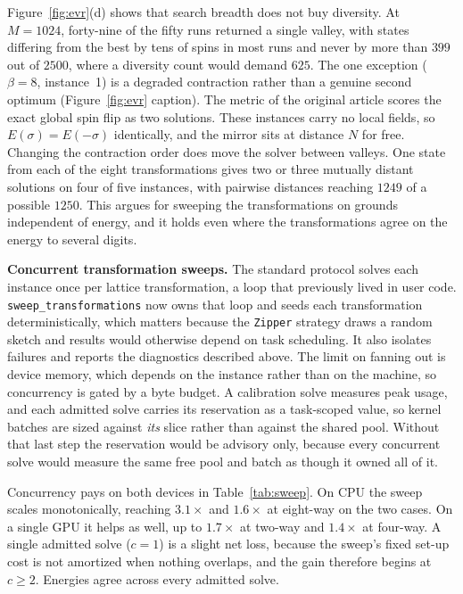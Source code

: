 \documentclass[preprint,12pt,a4paper]{elsarticle}
\begin{document}
Figure~\ref{fig:evr}(d) shows that search breadth does not buy diversity. At
$M=1024$, forty-nine of the fifty runs returned a single valley, with states
differing from the best by tens of spins in most runs and never by more than $399$
out of $2500$, where a diversity count would demand $625$. The one exception
($\beta{=}8$, instance~1) is a degraded contraction rather than a genuine second
optimum (Figure~\ref{fig:evr} caption). The metric of the original article scores
the exact global spin flip as two solutions. These instances carry no local fields,
so $E(\sigma)=E(-\sigma)$ identically, and the mirror sits at distance $N$ for free.
Changing the contraction order does move the solver between valleys. One state from
each of the eight transformations gives two or three mutually distant solutions on
four of five instances, with pairwise distances reaching $1249$ of a possible
$1250$. This argues for sweeping the transformations on grounds independent of
energy, and it holds even where the transformations agree on the energy to several
digits.

\textbf{Concurrent transformation sweeps.} The standard protocol solves each
instance once per lattice transformation, a loop that previously lived in user code.
\texttt{sweep\_transformations} now owns that loop and seeds each transformation
deterministically, which matters because the \texttt{Zipper} strategy draws a random
sketch and results would otherwise depend on task scheduling. It also isolates
failures and reports the diagnostics described above. The limit on fanning out is
device memory, which depends on the instance rather than on the machine, so
concurrency is gated by a byte budget. A calibration solve measures peak usage, and
each admitted solve carries its reservation as a task-scoped value, so kernel
batches are sized against \emph{its} slice rather than against the shared pool.
Without that last step the reservation would be advisory only, because every
concurrent solve would measure the same free pool and batch as though it owned all
of it.

Concurrency pays on both devices in Table~\ref{tab:sweep}. On CPU the sweep
scales monotonically, reaching $3.1\times$ and $1.6\times$ at eight-way on the two
cases. On a single GPU it helps as well, up to $1.7\times$ at two-way and
$1.4\times$ at four-way. A single admitted solve ($c{=}1$) is a slight net loss,
because the sweep's fixed set-up cost is not amortized when nothing overlaps, and the
gain therefore begins at $c{\ge}2$. Energies agree across every admitted solve.
\end{document}
